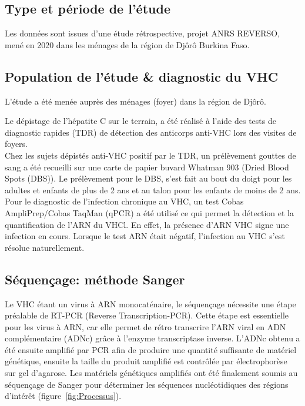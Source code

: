 \documentclass[a4paper,12pt]{article}
\begin{document}
\subsection{Type et période de l’étude}
Les données sont issues d’une étude rétrospective, projet ANRS REVERSO, mené en 2020 dans les ménages de la région de Djôrô Burkina Faso.

\subsection{Population de l'étude \& diagnostic du VHC}

L'étude a été menée auprès des ménages (foyer) dans la région de Djôrô. 

Le dépistage de l’hépatite C sur le terrain, a été réalisé à l’aide des tests de diagnostic rapides (TDR) de détection des anticorps anti-VHC lors des visites de foyers.\\

Chez les sujets dépistés anti-VHC positif par le TDR, un prélèvement gouttes de sang a été recueilli sur une carte de papier buvard Whatman 903 (Dried Blood Spots (DBS)). Le prélèvement pour le DBS, s’est fait au bout du doigt pour les adultes et enfants de plus de 2 ans et au talon pour les enfants de moins de 2 ans. Pour le diagnostic de l’infection chronique au VHC, un test Cobas AmpliPrep/Cobas TaqMan (qPCR) a été utilisé ce qui permet la détection et la quantification de l'ARN du VHCl. En effet, la présence d’ARN VHC signe une infection en cours. Lorsque le test ARN était négatif, l’infection au VHC s’est résolue naturellement. 

\subsection{Séquençage: méthode Sanger}

Le VHC étant un virus à ARN monocaténaire, le séquençage nécessite une étape préalable de RT-PCR (Reverse Transcription-PCR). Cette étape est essentielle pour les virus à ARN, car elle permet de rétro transcrire l’ARN viral en ADN complémentaire (ADNc) grâce à l’enzyme transcriptase inverse. L’ADNc obtenu a été  ensuite amplifié par PCR afin de produire une quantité suffisante de matériel génétique, ensuite la taille du produit amplifié est contrôlée par électrophorèse sur gel d’agarose. Les matériels génétiques amplifiés ont été finalement soumis au séquençage de Sanger pour déterminer les séquences nucléotidiques des régions d’intérêt (figure~\ref{fig:Processus}).
\end{document}
